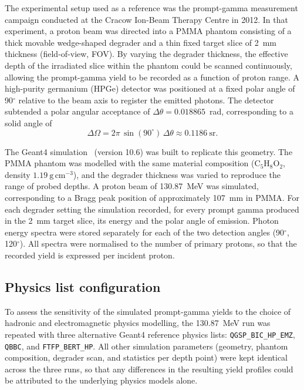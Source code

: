 \documentclass[a4paper]{article}
\begin{document}
The experimental setup used as a reference was the prompt-gamma measurement campaign conducted at the Cracow Ion-Beam Therapy Centre in 2012. In that experiment, a proton beam was directed into a PMMA phantom consisting of a thick movable wedge-shaped degrader and a thin fixed target slice of 2~mm thickness (field-of-view, FOV). By varying the degrader thickness, the effective depth of the irradiated slice within the phantom could be scanned continuously, allowing the prompt-gamma yield to be recorded as a function of proton range. A high-purity germanium (HPGe) detector was positioned at a fixed polar angle of 90$^\circ$ relative to the beam axis to register the emitted photons. The detector subtended a polar angular acceptance of $\Delta\theta = 0.018865$~rad, corresponding to a solid angle of
\begin{equation}
    \Delta\Omega = 2\pi\,\sin(90^\circ)\,\Delta\theta \approx 0.1186~\text{sr}.
\end{equation}

The Geant4 simulation~\cite{geant4} (version 10.6) was built to replicate this geometry. The PMMA phantom was modelled with the same material composition ($\mathrm{C_5H_8O_2}$, density $1.19~\mathrm{g\,cm^{-3}}$), and the degrader thickness was varied to reproduce the range of probed depths. A proton beam of 130.87~MeV was simulated, corresponding to a Bragg peak position of approximately 107~mm in PMMA. For each degrader setting the simulation recorded, for every prompt gamma produced in the 2~mm target slice, its energy and the polar angle of emission. Photon energy spectra were stored separately for each of the two detection angles (90$^\circ$, 120$^\circ$). All spectra were normalised to the number of primary protons, so that the recorded yield is expressed per incident proton.

\subsection{Physics list configuration}
\label{sec:physlists}

To assess the sensitivity of the simulated prompt-gamma yields to the choice of hadronic and electromagnetic physics modelling, the 130.87~MeV run was repeated with three alternative Geant4 reference physics lists: \texttt{QGSP\_BIC\_HP\_EMZ}, \texttt{QBBC}, and \texttt{FTFP\_BERT\_HP}. All other simulation parameters (geometry, phantom composition, degrader scan, and statistics per depth point) were kept identical across the three runs, so that any differences in the resulting yield profiles could be attributed to the underlying physics models alone.
\end{document}
